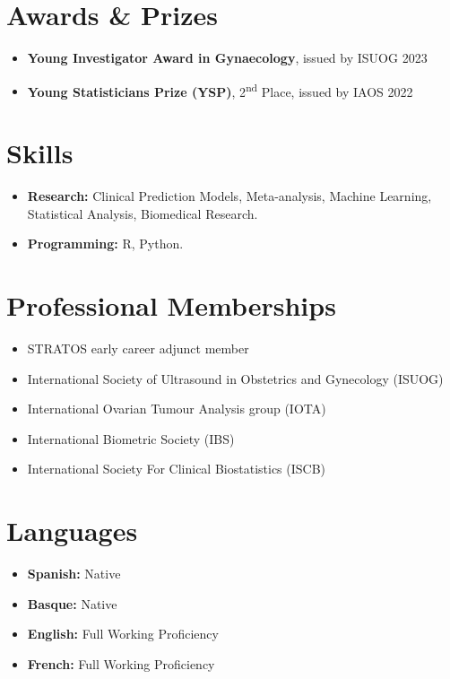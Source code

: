\section*{Awards \& Prizes}

\begin{itemize}
    \item \textbf{Young Investigator Award in Gynaecology}, issued by ISUOG \hfill 2023
    \item \textbf{Young Statisticians Prize (YSP)}, 2\textsuperscript{nd} Place, issued by IAOS \hfill 2022
\end{itemize}

\section*{Skills}

\begin{itemize}
    \item \textbf{Research:} Clinical Prediction Models, Meta-analysis, Machine Learning, Statistical Analysis, Biomedical Research.
    \item \textbf{Programming:} R, Python.
\end{itemize}

\section*{Professional Memberships}

\begin{itemize}
    \item STRATOS early career adjunct member
    \item International Society of Ultrasound in Obstetrics and Gynecology (ISUOG)
    \item International Ovarian Tumour Analysis group (IOTA)
    \item International Biometric Society (IBS)
    \item International Society For Clinical Biostatistics (ISCB)
\end{itemize}

\section*{Languages}

\begin{itemize}
    \item \textbf{Spanish:} Native
    \item \textbf{Basque:} Native
    \item \textbf{English:} Full Working Proficiency
    \item \textbf{French:} Full Working Proficiency
\end{itemize}
